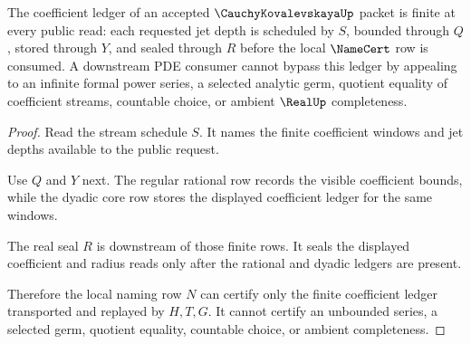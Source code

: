 \begin{theorem}
\label{thm:cauchy-kovalevskaya-finite-coefficient-ledger}
The coefficient ledger of an accepted $\CauchyKovalevskayaUp$ packet is finite at every public read: each requested jet depth is scheduled by $S$, bounded through $Q$, stored through $Y$, and sealed through $R$ before the local $\NameCert$ row is consumed. A downstream PDE consumer cannot bypass this ledger by appealing to an infinite formal power series, a selected analytic germ, quotient equality of coefficient streams, countable choice, or ambient $\RealUp$ completeness.
\end{theorem}
\begin{proof}
Read the stream schedule $S$. It names the finite coefficient windows and jet depths available to the public request.

Use $Q$ and $Y$ next. The regular rational row records the visible coefficient bounds, while the dyadic core row stores the displayed coefficient ledger for the same windows.

The real seal $R$ is downstream of those finite rows. It seals the displayed coefficient and radius reads only after the rational and dyadic ledgers are present.

Therefore the local naming row $N$ can certify only the finite coefficient ledger transported and replayed by $H,T,G$. It cannot certify an unbounded series, a selected germ, quotient equality, countable choice, or ambient completeness.
\end{proof}




